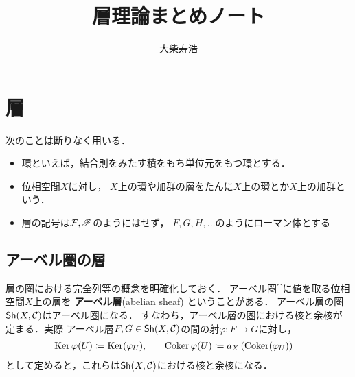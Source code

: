 


\def\inner<#1>{\langle #1 \rangle}

\def\ind<#1>{\mathop{\text{``}\hspace{-0.7pt}#1\limits\hspace{-1.5pt}\text{''}}}







\title{層理論まとめノート}
\author{大柴寿浩}

\maketitle
\frontmatter
\tableofcontents
\layout
\mainmatter
\chapter{層}



\begin{CNV}次のことは断りなく用いる．
    \begin{itemize}
        \item 環といえば，結合則をみたす積をもち単位元をもつ環とする．
        \item 位相空間$X$に対し，
        $X$上の環や加群の層をたんに$X$上の環とか$X$上の加群という．
        \item 層の記号は$\mathcal{F},\mathscr{F}$のようにはせず，
        $F,G,H,\ldots$のようにローマン体とする
    \end{itemize}
\end{CNV}

\section{アーベル圏の層}
層の圏における完全列等の概念を明確化しておく．
アーベル圏$\cat$に値を取る位相空間$X$上の層を
\textbf{アーベル層}(abelian sheaf) ということがある．
アーベル層の圏$\mathop{\textsf{Sh}}\nolimits(X,\mathcal{C})$はアーベル圏になる．
すなわち，アーベル層の圏における核と余核が定まる．実際
アーベル層$F,G\in\mathop{\textsf{Sh}}\nolimits(X,\mathcal{C})$の間の射$\varphi\colon F\to G$に対し，
\begin{alignat*}{2}
    \mathop{\mathrm{Ker}}\nolimits\varphi(U)&\coloneqq\mathop{\mathrm{Ker}}\nolimits(\varphi_U), 
    &\quad 
    \mathop{\mathrm{Coker}}\nolimits\varphi(U)&\coloneqq a_X\left(\mathop{\mathrm{Coker}}\nolimits(\varphi_U)\right)
\end{alignat*}
として定めると，これらは$\mathop{\textsf{Sh}}\nolimits(X,\mathcal{C})$における核と余核になる．

